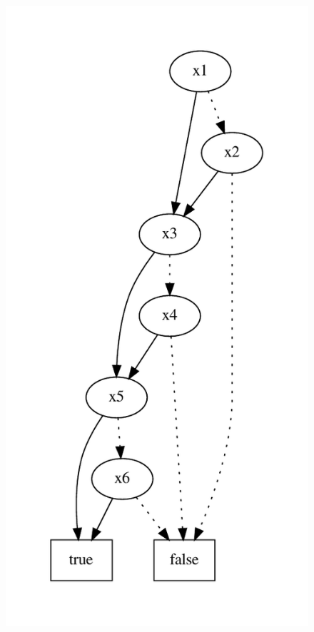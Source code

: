 \documentclass[a4paper, oneside]{report}
\begin{document}
\begin{figure}[h]
\centering
      \includegraphics[scale = 0.5]{exemple/bon_Ordre.pdf}

\end{figure}
\end{document}
